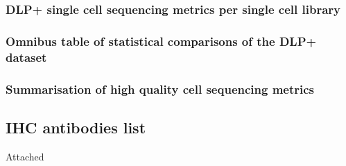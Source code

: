 \documentclass{article}
\begin{document}
\subsubsection{DLP+ single cell sequencing metrics per single cell library}
\begin{comment}
\end{comment}

\subsubsection{Omnibus table of statistical comparisons of the DLP+ dataset}

\subsubsection{Summarisation of high quality cell sequencing metrics}

\begin{comment}
passed/failed is simply if quality >= 0.75 or not, the number of cells that fall into these categories (edited) 
cells is total number of cells in the library
success_rate == passed / total cells
live_cells is cells with cell_state == C1
dead_cells is cells with cell_state == C2
\end{comment}



\subsection{IHC antibodies list}
Attached
\end{document}
